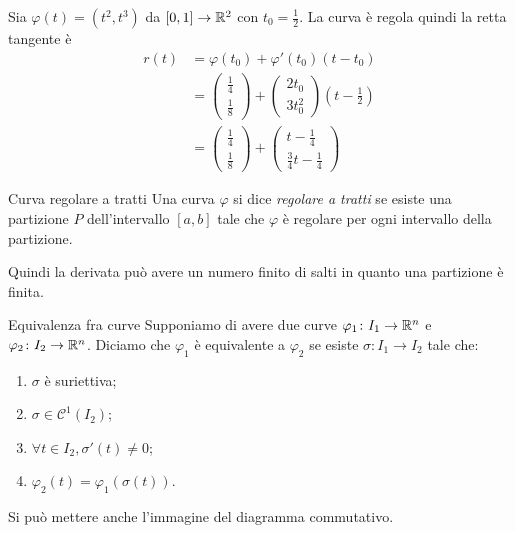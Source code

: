 \documentclass[a4paper]{article}
\begin{document}
\begin{radioactive}
\begin{snippetexample}{}
    Sia \(\varphi(t) = (t^2, t^3)\) da \([0,1] \to \mathbb{R}^2\) con \(t_0 = \frac{1}{2}\).
    La curva è regola quindi la retta tangente è 
    \begin{align*}
        r(t) &= \varphi(t_0) + \varphi'(t_0)(t-t_0) \\
        &= \begin{pmatrix} \frac{1}{4} \\ \frac{1}{8} \end{pmatrix}
        + \begin{pmatrix} 2t_0 \\ 3t_0^2 \end{pmatrix}\left(t-\frac{1}{2}\right) \\
        &= \begin{pmatrix} \frac{1}{4} \\ \frac{1}{8} \end{pmatrix}
        + \begin{pmatrix} t - \frac{1}{4} \\ \frac{3}{4}t - \frac{1}{4} \end{pmatrix}
    \end{align*}
\end{snippetexample}
\end{radioactive}

\begin{radioactive}
\begin{snippetdefinition}{Curva regolare a tratti}
    Una curva \(\varphi\) si dice \emph{regolare a tratti}
    se esiste una partizione \(P\) dell'intervallo \([a,b]\) tale che
    \(\varphi\) è regolare per ogni intervallo della partizione.
\end{snippetdefinition}
Quindi la derivata può avere un numero finito di salti
in quanto una partizione è finita.
\end{radioactive}

\begin{radioactive}
\begin{snippetdefinition}{Equivalenza fra curve}
    Supponiamo di avere due curve \(\varphi_1 \colon I_1 \to \mathbb{R}^n\)
    e \(\varphi_2 \colon I_2 \to \mathbb{R}^n\). Diciamo che \(\varphi_1\)
    è equivalente a \(\varphi_2\) se esiste
    \(\sigma \colon I_1 \to I_2\) tale che:
    \begin{enumerate}
        \item \(\sigma\) è suriettiva;
        \item \(\sigma \in \mathcal{C}^1(I_2)\);
        \item \(\forall t \in I_2, \sigma'(t) \neq 0\);
        \item \(\varphi_2(t) = \varphi_1(\sigma(t))\).
    \end{enumerate}
    Si può mettere anche l'immagine del diagramma commutativo.
\end{snippetdefinition}
\end{radioactive}
\end{document}

